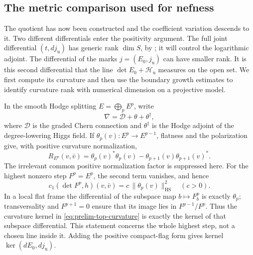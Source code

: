 \subsection{The metric comparison used for nefness}

The quotient has now been constructed and the coefficient variation
descends to it.  Two different differentials enter the positivity
argument.  The full joint differential $(t,dj_{\mathrm u})$ has generic
rank $\dim S$, by ; it will control the
logarithmic adjoint.  The differential of the marks
$j=(E_0,j_{\mathrm u})$ can have smaller rank.  It is this second
differential that the line $\det E_0+\mathcal H_{\mathrm u}$ measures
on the open set.  We first compute its curvature and then use the
boundary growth estimates to identify curvature rank with numerical
dimension on a projective model.

In the smooth Hodge splitting $E=\bigoplus_p E^p$, write
\[
 \nabla=\mathcal D+\theta+\theta^\dagger,
\]
where $\mathcal D$ is the graded Chern connection and
$\theta^\dagger$ is the Hodge adjoint of the degree-lowering Higgs field.
If $\theta_p(v):E^p\to E^{p-1}$, flatness and the polarization give,
with positive curvature normalization,
\begin{equation}\label{eq:prelim-hodge-curvature}
 R_{E^p}(v,\bar v)=
 \theta_p(v)^*\theta_p(v)
 -\theta_{p+1}(v)\theta_{p+1}(v)^*.
\end{equation}
The irrelevant common positive normalization factor is suppressed here.
For the highest nonzero step $F^p=E^p$, the second term vanishes, and hence
\begin{equation}\label{eq:prelim-top-curvature}
 c_1(\det F^p,h)(v,\bar v)
 =c\,\|\theta_p(v)\|_{\mathrm{HS}}^2\quad(c>0).
\end{equation}
In a local flat frame the differential of the subspace map
$b\mapsto F^p_b$ is exactly $\theta_p$; transversality and $F^{p+1}=0$
ensure that its image lies in $F^{p-1}/F^p$.  Thus the curvature kernel
in \eqref{eq:prelim-top-curvature} is exactly the kernel of that
subspace differential.  This statement concerns the whole highest
step, not a chosen line inside it.  Adding the positive compact-flag
form gives kernel $\ker(dE_0,dj_{\mathrm u})$.

